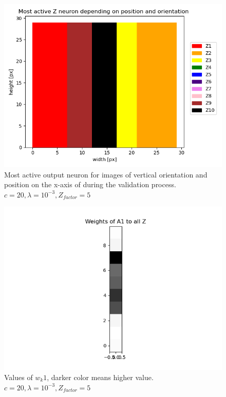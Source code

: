 \begin{figure}
  \includegraphics[width=\linewidth]{figures/horvert/horvert_c20_3_Zfactor5_verticalLines.png}
  \caption{Most active output neuron for images of vertical orientation and position on the x-axis of during the validation process. $c = 20, \lambda = 10^{-3}, Z_{factor} = 5$}
  \label{fig:horvert_c20_3_Zfactor5_verticalLines}
\end{figure}

\begin{figure}
  \includegraphics[width=\linewidth]{figures/horvert/horvert_c20_3_Zfactor5_priorWeight1.png}
  \caption{Values of $w_k1$, darker color means higher value. $c = 20, \lambda = 10^{-3}, Z_{factor} = 5$}
  \label{fig:wkl1}
\end{figure}

